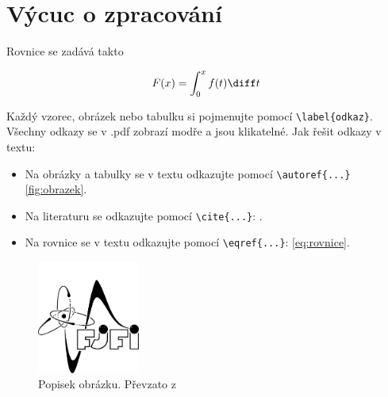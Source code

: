 \section*{Výcuc o zpracování}
Rovnice se zadává takto

\begin{equation}
	F(x) = \int_{0}^{x} f(t) \diff t
	\label{eq:rovnice}
\end{equation}

Každý vzorec, obrázek nebo tabulku si pojmenujte pomocí \verb|\label{odkaz}|. Všechny odkazy se v .pdf zobrazí modře a jsou klikatelné.  Jak řešit odkazy v textu:
\begin{itemize}
	\item Na obrázky a tabulky se v textu odkazujte pomocí \verb|\autoref{...}| \autoref{fig:obrazek}.
	
	\item Na literaturu se odkazujte pomocí \verb|\cite{...}|: \cite{Tabulky}.
	
	\item Na rovnice se v textu odkazujte pomocí \verb|\eqref{...}|: \eqref{eq:rovnice}.
	
\end{itemize}			


\begin{figure}[!hbt] %
	\centering
	\includegraphics[width=0.3\textwidth]{img/fjfi} %
	\caption{Popisek obrázku. Převzato z \cite{bib:zadani}} %
	\label{fig:obrazek} %
\end{figure}			

